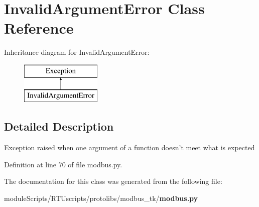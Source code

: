 \section{Invalid\+Argument\+Error Class Reference}
\label{classprotolibs_1_1modbus__tk_1_1modbus_1_1_invalid_argument_error}
Inheritance diagram for Invalid\+Argument\+Error\+:\begin{figure}[H]
\begin{center}
\leavevmode
\includegraphics[height=2.000000cm]{classprotolibs_1_1modbus__tk_1_1modbus_1_1_invalid_argument_error}
\end{center}
\end{figure}


\subsection{Detailed Description}
\begin{DoxyVerb}Exception raised when one argument of a function doesn't meet 
what is expected
\end{DoxyVerb}
 

Definition at line 70 of file modbus.\+py.



The documentation for this class was generated from the following file\+:\begin{DoxyCompactItemize}
\item 
module\+Scripts/\+R\+T\+Uscripts/protolibs/modbus\+\_\+tk/{\bf modbus.\+py}\end{DoxyCompactItemize}
